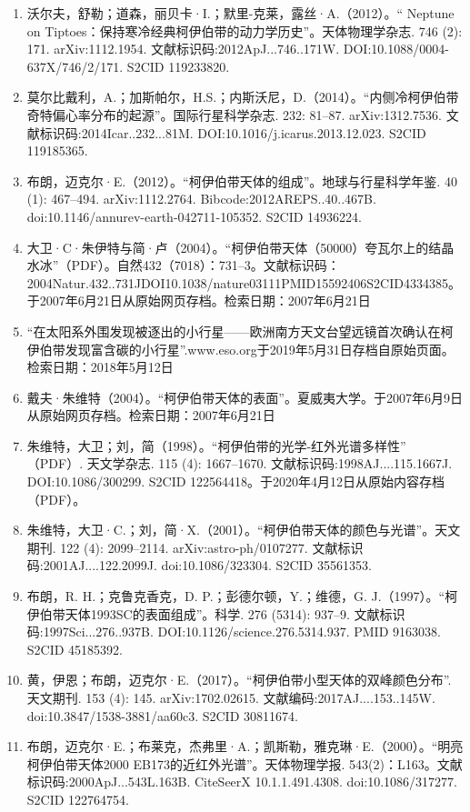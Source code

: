 \begin{enumerate}
\item 沃尔夫，舒勒；道森，丽贝卡·I.；默里-克莱，露丝·A.（2012）。“ Neptune on Tiptoes：保持寒冷经典柯伊伯带的动力学历史”。天体物理学杂志. 746 (2): 171. arXiv:1112.1954. 文献标识码:2012ApJ...746..171W. DOI:10.1088/0004-637X/746/2/171. S2CID 119233820.
\item 莫尔比戴利，A.；加斯帕尔，H.S.；内斯沃尼，D.（2014）。“内侧冷柯伊伯带奇特偏心率分布的起源”。国际行星科学杂志. 232: 81–87. arXiv:1312.7536. 文献标识码:2014Icar..232...81M. DOI:10.1016/j.icarus.2013.12.023. S2CID 119185365.
\item 布朗，迈克尔·E.（2012）。“柯伊伯带天体的组成”。地球与行星科学年鉴. 40 (1): 467–494. arXiv:1112.2764. Bibcode:2012AREPS..40..467B. doi:10.1146/annurev-earth-042711-105352. S2CID 14936224.
\item 大卫·C·朱伊特与简·卢（2004）。“柯伊伯带天体（50000）夸瓦尔上的结晶水冰”（PDF）。自然432（7018）：731–3。文献标识码：2004Natur.432..731JDOI10.1038/nature03111PMID15592406S2CID4334385。于2007年6月21日从原始网页存档。检索日期：2007年6月21日
\item “在太阳系外围发现被逐出的小行星——欧洲南方天文台望远镜首次确认在柯伊伯带发现富含碳的小行星”.www.eso.org于2019年5月31日存档自原始页面。检索日期：2018年5月12日
\item 戴夫·朱维特（2004）。“柯伊伯带天体的表面”。夏威夷大学。于2007年6月9日从原始网页存档。检索日期：2007年6月21日
\item 朱维特，大卫；刘，简（1998）。“柯伊伯带的光学-红外光谱多样性” （PDF）. 天文学杂志. 115 (4): 1667–1670. 文献标识码:1998AJ....115.1667J. DOI:10.1086/300299. S2CID 122564418。于2020年4月12日从原始内容存档 （PDF）。
\item 朱维特，大卫·C.；刘，简·X.（2001）。“柯伊伯带天体的颜色与光谱”。天文期刊. 122 (4): 2099–2114. arXiv:astro-ph/0107277. 文献标识码:2001AJ....122.2099J. doi:10.1086/323304. S2CID 35561353.
\item 布朗，R. H.；克鲁克香克，D. P.；彭德尔顿，Y.；维德，G. J.（1997）。“柯伊伯带天体1993SC的表面组成”。科学. 276 (5314): 937–9. 文献标识码:1997Sci...276..937B. DOI:10.1126/science.276.5314.937. PMID 9163038. S2CID 45185392.
\item 黄，伊恩；布朗，迈克尔·E.（2017）。“柯伊伯带小型天体的双峰颜色分布”. 天文期刊. 153 (4): 145. arXiv:1702.02615. 文献编码:2017AJ....153..145W. doi:10.3847/1538-3881/aa60c3. S2CID 30811674.
\item 布朗，迈克尔·E.；布莱克，杰弗里·A.；凯斯勒，雅克琳·E.（2000）。“明亮柯伊伯带天体2000 EB173的近红外光谱”。天体物理学报. 543(2)：L163。文献标识码:2000ApJ...543L.163B. CiteSeerX 10.1.1.491.4308. doi:10.1086/317277. S2CID 122764754.

\end{enumerate}
